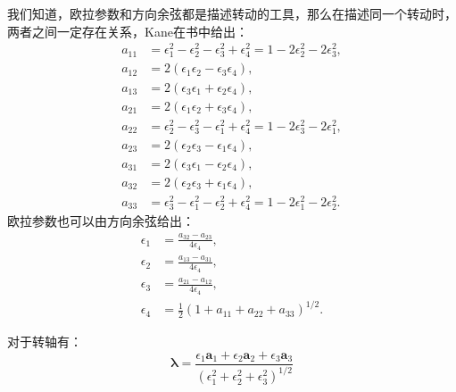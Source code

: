 我们知道，欧拉参数和方向余弦都是描述转动的工具，那么在描述同一个转动时，两者之间一定存在关系，Kane在书中给出：
\begin{equation}
    \begin{aligned}
        a_{11} &= \epsilon_1^2 - \epsilon_2^2 - \epsilon_3^2 + \epsilon_4^2 = 1 - 2\epsilon_2^2 - 2\epsilon_3^2,\\
        a_{12} &= 2(\epsilon_1 \epsilon_2 - \epsilon_3 \epsilon_4),\\
        a_{13} &= 2(\epsilon_3 \epsilon_1 + \epsilon_2 \epsilon_4),\\
        a_{21} &= 2(\epsilon_1 \epsilon_2 + \epsilon_3 \epsilon_4),\\
        a_{22} &= \epsilon_2^2 - \epsilon_3^2 - \epsilon_1^2 + \epsilon_4^2 = 1 - 2\epsilon_3^2 - 2\epsilon_1^2,\\
        a_{23} &= 2(\epsilon_2 \epsilon_3 - \epsilon_1 \epsilon_4),\\
        a_{31} &= 2(\epsilon_3 \epsilon_1 - \epsilon_2 \epsilon_4),\\
        a_{32} &= 2(\epsilon_2 \epsilon_3 + \epsilon_1 \epsilon_4),\\
        a_{33} &= \epsilon_3^2 - \epsilon_1^2 - \epsilon_2^2 + \epsilon_4^2 = 1 - 2\epsilon_1^2 - 2\epsilon_2^2.
    \end{aligned}
    \label{eq:欧拉参数转方向余弦}
\end{equation}
欧拉参数也可以由方向余弦给出：
\begin{equation}
    \begin{aligned}
        \epsilon_{1} &= \frac{a_{32}-a_{23}}{4\epsilon_4},\\
        \epsilon_{2} &= \frac{a_{13}-a_{31}}{4\epsilon_4},\\
        \epsilon_{3} &= \frac{a_{21}-a_{12}}{4\epsilon_4},\\
        \epsilon_4 &= \frac{1}{2}\left(1+a_{11}+a_{22}+a_{33}\right)^{1/2}.
    \end{aligned}
    \label{eq:方向余弦转欧拉参数}
\end{equation}

对于转轴有：
\begin{equation}
    \bm{\lambda}=\frac{\epsilon_1\mathbf{a}_1+\epsilon_2\mathbf{a}_2+\epsilon_3\mathbf{a}_3}{(\epsilon_1^2+\epsilon_2^2+\epsilon_3^2)^{1/2}}
    \label{eq:欧拉参数得转轴}
\end{equation}

